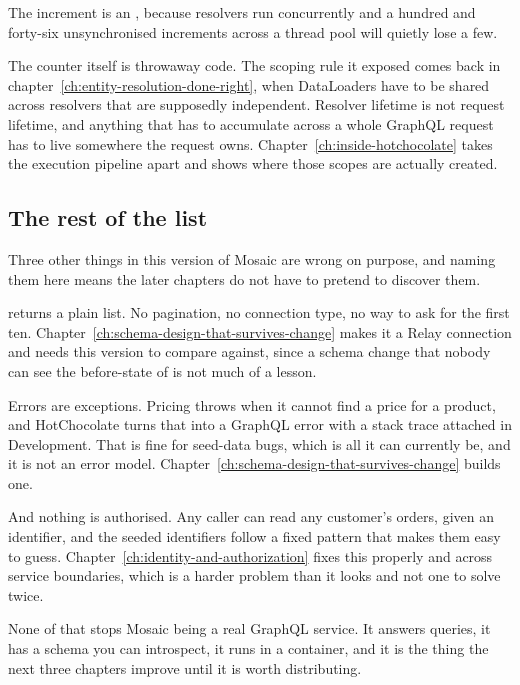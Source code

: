 The increment is an , because resolvers run
concurrently and a hundred and forty-six unsynchronised increments across a
thread pool will quietly lose a few.

The counter itself is throwaway code. The scoping rule it exposed comes back in
chapter~\ref{ch:entity-resolution-done-right}, when DataLoaders have to be shared
across resolvers that are supposedly independent. Resolver lifetime is not
request lifetime, and anything that has to accumulate across a whole GraphQL
request has to live somewhere the request owns.
Chapter~\ref{ch:inside-hotchocolate} takes the execution pipeline apart and shows
where those scopes are actually created.

\subsection*{The rest of the list}

Three other things in this version of Mosaic are wrong on purpose, and naming
them here means the later chapters do not have to pretend to discover them.

 returns a plain list. No pagination, no connection type, no way
to ask for the first ten. Chapter~\ref{ch:schema-design-that-survives-change}
makes it a Relay connection and needs this version to compare against, since a
schema change that nobody can see the before-state of is not much of a lesson.

Errors are exceptions. Pricing throws when it cannot find a price for a
product, and HotChocolate turns that into a GraphQL error with a stack trace
attached in Development. That is fine for seed-data bugs, which is all it can
currently be, and it is not an error model.
Chapter~\ref{ch:schema-design-that-survives-change} builds one.

And nothing is authorised. Any caller can read any customer's orders, given an
identifier, and the seeded identifiers follow a fixed pattern that makes them
easy to guess. Chapter~\ref{ch:identity-and-authorization} fixes this properly
and across service boundaries, which is a harder problem than it looks and not
one to solve twice.

None of that stops Mosaic being a real GraphQL service. It answers queries, it
has a schema you can introspect, it runs in a container, and it is the thing the
next three chapters improve until it is worth distributing.
